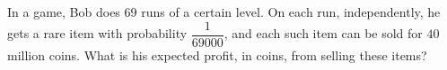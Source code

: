 In a game, Bob does $69$ runs of a certain level. On each run, independently, he gets a rare item with probability $\dfrac{1}{69000}$, and each such item can be sold for $40$ million coins. What is his expected profit, in coins, from selling these items?
